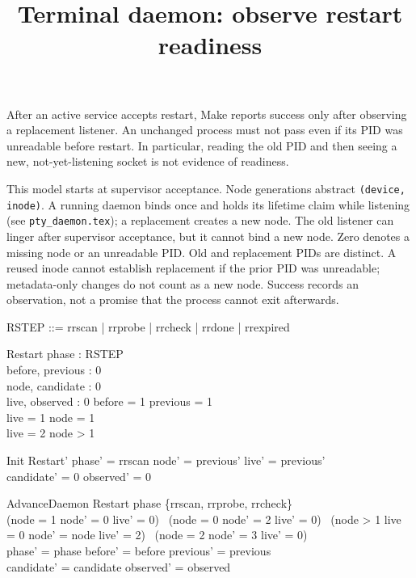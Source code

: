 \documentclass[a4paper,10pt]{article}
\begin{document}
\title{Terminal daemon: observe restart readiness}
\maketitle

After an active service accepts restart, Make reports success only after
observing a replacement listener. An unchanged process must not pass even
if its PID was unreadable before restart. In particular, reading the old PID
and then seeing a new, not-yet-listening socket is not evidence of readiness.

This model starts at supervisor acceptance. Node generations abstract
\texttt{(device, inode)}. A running daemon binds once and holds its
lifetime claim while listening (see \texttt{pty\_daemon.tex}); a replacement
creates a new node. The old listener can linger after supervisor acceptance,
but it cannot bind a new node. Zero denotes a missing node or an unreadable
PID. Old and replacement PIDs are distinct. A reused inode cannot establish
replacement if the prior PID was unreadable; metadata-only changes do not
count as a new node. Success records an observation, not a promise that the
process cannot exit afterwards.

\begin{zed}
RSTEP ::= rrscan | rrprobe | rrcheck | rrdone | rrexpired
\end{zed}

\begin{schema}{Restart}
phase : RSTEP \\
before, previous : 0  \\
node, candidate : 0  \\
live, observed : 0 
\where
before = 1 \implies previous = 1 \\
live = 1 \implies node = 1 \\
live = 2 \implies node > 1
\end{schema}

\begin{schema}{Init}
Restart'
\where
phase' = rrscan \land node' = previous' \land live' = previous' \\
candidate' = 0 \land observed' = 0
\end{schema}

\begin{schema}{AdvanceDaemon}
\Delta Restart
\where
phase \in \{rrscan, rrprobe, rrcheck\} \\
(node = 1 \land node' = 0 \land live' = 0) \lor
\quad~(node = 0 \land node' = 2 \land live' = 0) \lor
\quad~(node > 1 \land live = 0 \land node' = node \land live' = 2)
\quad~\lor (node = 2 \land node' = 3 \land live' = 0) \\
phase' = phase \land before' = before \land previous' = previous \\
candidate' = candidate \land observed' = observed
\end{schema}
\end{document}
